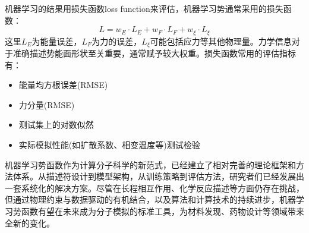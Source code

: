 机器学习的结果用损失函数\textrm{loss function}来评估，机器学习势通常采用的损失函数：
\begin{equation}
	L = w_E·L_E + w_F·L_F + w_{\xi}\cdot L_{\xi}
	\label{eq:MLP-7}
\end{equation}
这里$L_E$为能量误差，$L_F$为力的误差，$L_{\xi}$可能包括应力等其他物理量。力学信息对于准确描述势能面形状至关重要，通常赋予较大权重。损失函数常用的评估指标有：
\begin{itemize}
	\item 能量均方根误差\textrm{(RMSE)}
	\item 力分量\textrm{(RMSE)}
	\item 测试集上的对数似然
	\item 实际模拟性能(如扩散系数、相变温度等)测试检验
\end{itemize}

%




机器学习势函数作为计算分子科学的新范式，已经建立了相对完善的理论框架和方法体系。从描述符设计到模型架构，从训练策略到评估方法，研究者们已经发展出一套系统化的解决方案。尽管在长程相互作用、化学反应描述等方面仍存在挑战，但通过物理约束与数据驱动的有机结合，以及算法和计算技术的持续进步，机器学习势函数有望在未来成为分子模拟的标准工具，为材料发现、药物设计等领域带来全新的变化。 %


